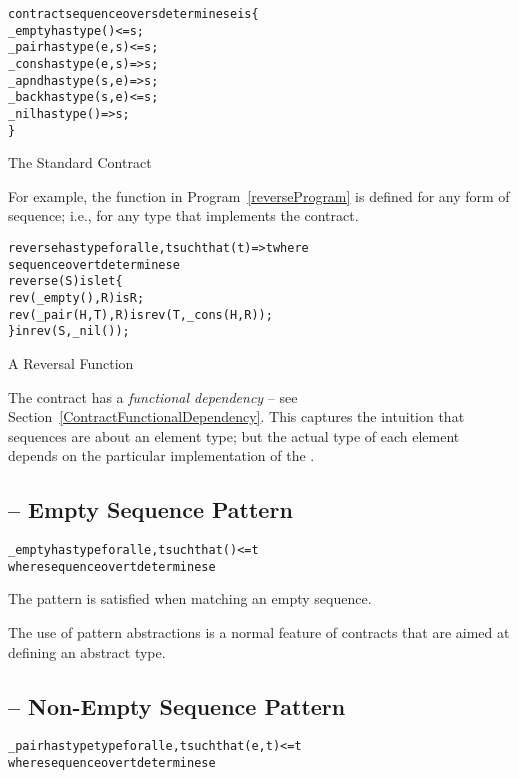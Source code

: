 \begin{program}[hbtp]
\begin{alltt}
contract sequence over s determines e is \{
  \_empty has type ()<=s;
  \_pair has type (e,s)<=s;
  \_cons has type (e,s)=>s;
  \_apnd has type (s,e)=>s;
  \_back has type (s,e)<=s;
  \_nil has type ()=>s;
\}
\end{alltt}
\caption{The Standard  Contract}\label{sequenceContractDef}
\end{program}
\noindent
For example, the  function in Program~\vref{reverseProgram} is defined for any form of sequence; i.e., for any type that implements the  contract.
\begin{program}[hbtp]
\begin{alltt}
reverse has type for all e,t such that (t)=>t where
  sequence over t determines e
reverse(S) is let\{
  rev(\_empty(),R) is R;
  rev(\_pair(H,T),R) is rev(T,\_cons(H,R));
\} in rev(S,\_nil());
\end{alltt}
\caption{A  Reversal Function}\label{reverseProgram}
\end{program}
\begin{aside}
The  contract has a \emph{functional dependency} -- see Section~\vref{ContractFunctionalDependency}. This captures the intuition that sequences are about an element type; but the actual type of each element depends on the particular implementation of the .
\end{aside}

\subsection{ -- Empty Sequence Pattern}
\label{emptyPattern}
\begin{alltt}
\_empty has type for all e,t such that ()<=t 
                 where sequence over t determines e
\end{alltt}

The  pattern is satisfied when matching an empty sequence.

\begin{aside}
The use of pattern abstractions is a normal feature of contracts that are aimed at defining an abstract type. 
\end{aside}

\subsection{ -- Non-Empty Sequence Pattern}
\label{nonEmptyPattern}
\begin{alltt}
\_pair has type type for all e,t such that (e,t)<=t
                     where sequence over t determines e
\end{alltt}

